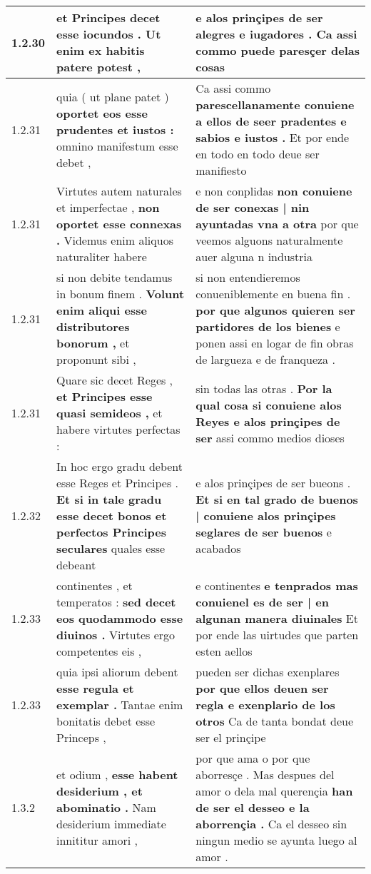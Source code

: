 \begin{tabular}{|p{1cm}|p{6.5cm}|p{6.5cm}|}
1.2.30 & et Principes decet \textbf{ esse iocundos . } Ut enim ex habitis patere potest , & e alos prinçipes \textbf{ de ser alegres e iugadores . } Ca assi commo puede paresçer delas cosas \\\hline
1.2.31 & quia ( ut plane patet ) \textbf{ oportet eos esse prudentes et iustos : } omnino manifestum esse debet , & Ca assi commo \textbf{ parescellanamente conuiene a ellos de seer pradentes e sabios e iustos . } Et por ende en todo en todo deue ser manifiesto \\\hline
1.2.31 & Virtutes autem naturales et imperfectae , \textbf{ non oportet esse connexas . } Videmus enim aliquos naturaliter habere & e non conplidas \textbf{ non conuiene de ser conexas | nin ayuntadas vna a otra } por que veemos alguons naturalmente auer alguna n industria \\\hline
1.2.31 & si non debite tendamus in bonum finem . \textbf{ Volunt enim aliqui esse distributores bonorum , } et proponunt sibi , & si non entendieremos conueniblemente en buena fin . \textbf{ por que algunos quieren ser partidores de los bienes } e ponen assi en logar de fin obras de largueza e de franqueza . \\\hline
1.2.31 & Quare sic decet Reges , \textbf{ et Principes esse quasi semideos , } et habere virtutes perfectas : & sin todas las otras . \textbf{ Por la qual cosa si conuiene alos Reyes e alos prinçipes de ser } assi commo medios dioses \\\hline
1.2.32 & In hoc ergo gradu debent esse Reges et Principes . \textbf{ Et si in tale gradu esse decet bonos et perfectos Principes seculares } quales esse debeant & e alos prinçipes de ser bueons . \textbf{ Et si en tal grado de buenos | conuiene alos prinçipes seglares de ser buenos } e acabados \\\hline
1.2.33 & continentes , et temperatos : \textbf{ sed decet eos quodammodo esse diuinos . } Virtutes ergo competentes eis , & e continentes \textbf{ e tenprados mas conuienel es de ser | en algunan manera diuinales } Et por ende las uirtudes que parten esten aellos \\\hline
1.2.33 & quia ipsi aliorum debent \textbf{ esse regula et exemplar . } Tantae enim bonitatis debet esse Princeps , & pueden ser dichas exenplares \textbf{ por que ellos deuen ser regla e exenplario de los otros } Ca de tanta bondat deue ser el prinçipe \\\hline
1.3.2 & et odium , \textbf{ esse habent desiderium , et abominatio . } Nam desiderium immediate innititur amori , & por que ama o por que aborresçe . Mas despues del amor o dela mal querençia \textbf{ han de ser el desseo e la aborrençia . } Ca el desseo sin ningun medio se ayunta luego al amor . \\\hline

\end{tabular}
